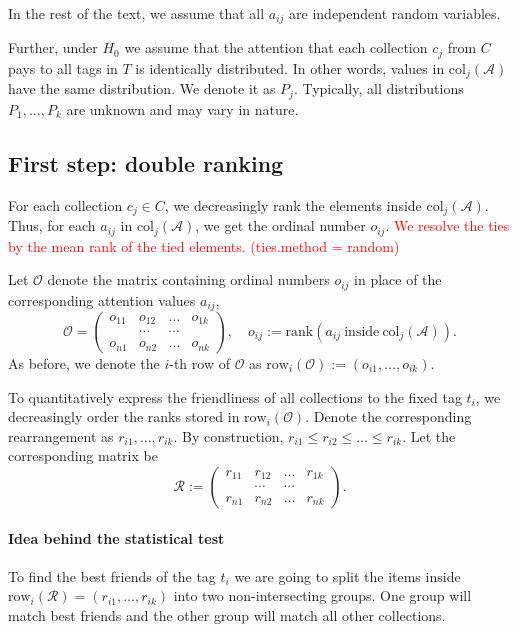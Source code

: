 \documentclass{llncs}
\begin{document}
In the rest of the text, we assume that all $a_{ij}$ are independent random variables.

Further, under $H_0$ we assume that the attention that each collection $c_j$ from $C$ pays to all tags in $T$ is identically distributed. In other words, values in $\text{col}_j(\mathcal{A})$have the same distribution. We denote it as $P_j$. Typically, all distributions $P_1, \dots, P_k$ are unknown and may vary in nature. 

\subsection*{First step: double ranking}


For each collection $c_j \in C$, we decreasingly rank the elements inside $\text{col}_j(\mathcal{A})$. Thus, for each $a_{ij} $ in $\text{col}_j(\mathcal{A})$, we get the ordinal number $o_{ij}$. \textcolor{red}{We resolve the ties by the mean rank of the tied elements. (ties.method = random)} 

Let $\mathcal{O}$ denote the matrix containing ordinal numbers $o_{ij}$ in place of the corresponding attention values $a_{ij}$, 
\begin{equation*}
\mathcal{O} = \begin{pmatrix}
o_{11} & o_{12} & \dots & o_{1k} \\
 &\cdots & \cdots & \\
o_{n1} & o_{n2} & \dots & o_{nk}
\end{pmatrix}, 
\quad
o_{ij} :=\text{rank}\left(a_{ij}~ \text{inside}~\text{col}_j(\mathcal{A})\right).
\end{equation*}
As before, we denote the $i$-th row of $\mathcal{O}$ as $\text{row}_i(\mathcal{O}) := (o_{i1}, \dots, o_{ik})$.

To quantitatively express the friendliness of all collections to the fixed tag $t_i$, we decreasingly order the ranks stored in $\text{row}_i(\mathcal{O})$. Denote the corresponding rearrangement as $r_{i1}, \dots, r_{ik}$. By construction, $r_{i1} \le r_{i2} \le \dots \le r_{ik}$. Let the corresponding matrix be
\begin{equation}
\label{def:R}
\mathcal{R} := \begin{pmatrix}
r_{11} & r_{12} & \dots & r_{1k} \\
 &\cdots & \cdots & \\
r_{n1} & r_{n2} & \dots & r_{nk}
\end{pmatrix}.
\end{equation}
\paragraph{Idea behind the statistical test} To find the best friends of the tag $t_i$ we are going to split the items inside $\text{row}_{i}(\mathcal{R}) = (r_{i1}, \dots, r_{ik})$ into two non-intersecting groups. One group will match best friends and the other group will match all other collections. 
\end{document}
